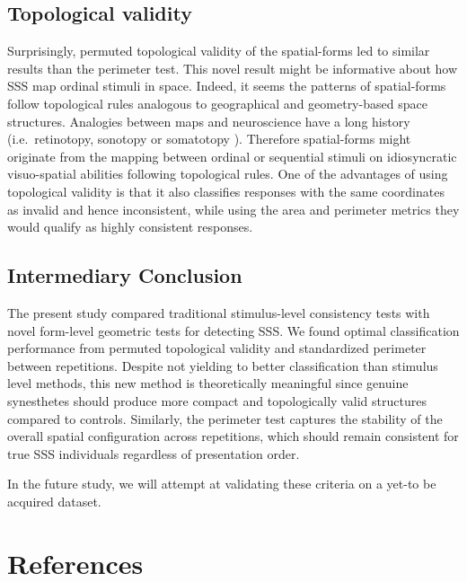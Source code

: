 \documentclass[
  man,
  longtable,
  a4paper,
  nolmodern,
  notxfonts,
  notimes,
  colorlinks=true,linkcolor=blue,citecolor=blue,urlcolor=blue]{apa7}
\begin{document}
\subsection{Topological validity}\label{topological-validity}

Surprisingly, permuted topological validity of the spatial-forms led to
similar results than the perimeter test. This novel result might be
informative about how SSS map ordinal stimuli in space. Indeed, it seems
the patterns of spatial-forms follow topological rules analogous to
geographical and geometry-based space structures. Analogies between maps
and neuroscience have a long history (i.e.~retinotopy, sonotopy or
somatotopy ).
Therefore spatial-forms might originate from the mapping between ordinal
or sequential stimuli on idiosyncratic visuo-spatial abilities following
topological rules. One of the advantages of using topological validity
is that it also classifies responses with the same coordinates as
invalid and hence inconsistent, while using the area and perimeter
metrics they would qualify as highly consistent responses.

\subsection{Intermediary Conclusion}\label{sec-conclusions}

The present study compared traditional stimulus-level consistency tests
with novel form-level geometric tests for detecting SSS. We found
optimal classification performance from permuted topological validity
and standardized perimeter between repetitions. Despite not yielding to
better classification than stimulus level methods, this new method is
theoretically meaningful since genuine synesthetes should produce more
compact and topologically valid structures compared to controls.
Similarly, the perimeter test captures the stability of the overall
spatial configuration across repetitions, which should remain consistent
for true SSS individuals regardless of presentation order.

In the future study, we will attempt at validating these criteria on a
yet-to be acquired dataset.

\section{References}\label{references}
\end{document}
